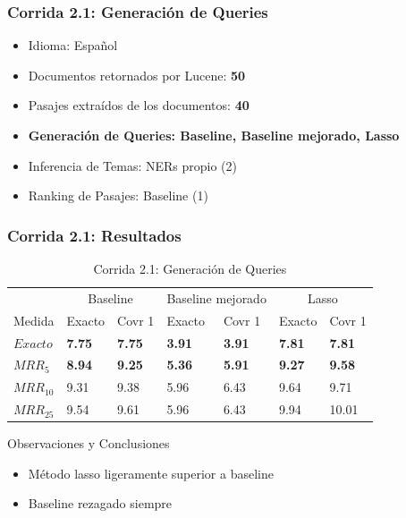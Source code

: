 \begin{frame}
\frametitle{Corrida 2.1: Generación de Queries}

\begin{itemize}
  \item Idioma: Español
  \item Documentos retornados por Lucene: \textbf{50}
  \item Pasajes extraídos de los documentos: \textbf{40}
  \item \textbf{{\color{blue}Generación de Queries: Baseline, Baseline mejorado, Lasso}}
  \item Inferencia de Temas: NERs propio (2)
  \item Ranking de Pasajes: Baseline (1)
\end{itemize}

\end{frame}

\begin{frame}
\frametitle{Corrida 2.1: Resultados}


\begin{table}
\centering
\begin{center}
\begin{tabular}{|l | l | l | l | l | l | l |}

& \multicolumn{2}{|c|}{Baseline} & \multicolumn{2}{|c|}{Baseline mejorado} & \multicolumn{2}{|c|}{Lasso}\\ 
Medida & Exacto & Covr 1 & Exacto & Covr 1 & Exacto & Covr 1 \\ 

\textbf{$Exacto$} & \textbf{7.75} & \textbf{7.75} &  \textbf{3.91} & \textbf{3.91} & \textbf{{\color{green}7.81}} & \textbf{{\color{green}7.81}} \\ 
$MRR_{5}$ & \textbf{8.94} & \textbf{9.25} &  \textbf{5.36} & \textbf{5.91} & \textbf{9.27} & \textbf{9.58}   \\ 
$MRR_{10}$ & 9.31 & 9.38 &  5.96 & 6.43 & 9.64 & 9.71   \\ 
$MRR_{25}$ & 9.54 & 9.61 &  5.96 & 6.43 & 9.94 & 10.01  \\ 
\end{tabular}

\caption{Corrida 2.1: Generación de Queries}
\end{center}
\end{table}

Observaciones y Conclusiones
\begin{itemize}
  \item Método lasso ligeramente superior a baseline
  \item Baseline  rezagado siempre
\end{itemize}

\end{frame}


